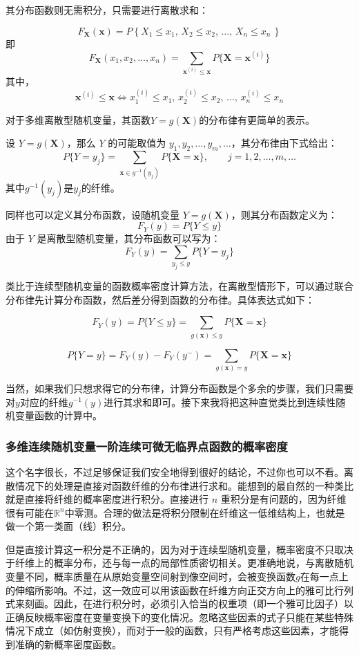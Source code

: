 其分布函数则无需积分，只需要进行离散求和：

\[
F_{\mathbf{X}}(\mathbf{x}) = P\left\{X_1 \leq x_1,\, X_2 \leq x_2,\, \ldots,\, X_n \leq x_n\, \right\}
\]
即
\[
F_{\mathbf{X}}(x_1, x_2, \ldots, x_n)
= \sum_{\mathbf{x}^{(i)} \leq \mathbf{x}} P\{\mathbf{X} = \mathbf{x}^{(i)}\}
\]
其中，
\[
\mathbf{x}^{(i)} \leq \mathbf{x} \iff x_1^{(i)} \leq x_1,\, x_2^{(i)} \leq x_2,\, \ldots,\, x_n^{(i)} \leq x_n
\]

对于多维离散型随机变量，其函数$Y = g(\mathbf{X})$的分布律有更简单的表示。

设 $Y = g(\mathbf{X})$，那么 $Y$ 的可能取值为 $y_1,y_2,\ldots,y_m,\ldots$，其分布律由下式给出：
\[
P\{Y = y_j\} = \sum_{\mathbf{x} \in g^{-1}(y_j)} P\{\mathbf{X} = \mathbf{x}\},\qquad j=1,2,\ldots, m, \ldots
\]
其中$g^{-1}(y_j)$是$y_j$的纤维。

同样也可以定义其分布函数，设随机变量 $Y = g(\mathbf{X})$，则其分布函数定义为：
\[
F_Y(y) = P\{Y \leq y\}
\]
由于 $Y$ 是离散型随机变量，其分布函数可以写为：
\[
F_Y(y) = \sum_{y_j \leq y} P\{Y = y_j\}
\]

类比于连续型随机变量的函数概率密度计算方法，在离散型情形下，可以通过联合分布律先计算分布函数，然后差分得到函数的分布律。具体表达式如下：

\[
F_Y(y) = P\{ Y \leq y \} = \sum_{g(\mathbf{x}) \leq y} P\{ \mathbf{X} = \mathbf{x} \}
\]

\[
P\{ Y = y \} = F_Y(y) - F_Y(y^-) = \sum_{g(\mathbf{x}) = y} P\{ \mathbf{X} = \mathbf{x} \}
\]

当然，如果我们只想求得它的分布律，计算分布函数是个多余的步骤，我们只需要对$y$对应的纤维$g^{-1}(y)$进行其求和即可。接下来我将把这种直觉类比到连续性随机变量函数的计算中。

\subsubsection{多维连续随机变量一阶连续可微无临界点函数的概率密度}

这个名字很长，不过足够保证我们安全地得到很好的结论，不过你也可以不看。离散情况下的处理是直接对函数纤维的分布律进行求和。能想到的最自然的一种类比就是直接将纤维的概率密度进行积分。直接进行 $n$ 重积分是有问题的，因为纤维很有可能在$\mathbb{R}^n$中零测。合理的做法是将积分限制在纤维这一低维结构上，也就是做一个第一类面（线）积分。

但是直接计算这一积分是不正确的，因为对于连续型随机变量，概率密度不只取决于纤维上的概率分布，还与每一点的局部性质密切相关。更准确地说，与离散随机变量不同，概率质量在从原始变量空间射到像空间时，会被变换函数$g$在每一点上的伸缩所影响。不过，这一效应可以用该函数在纤维方向正交方向上的雅可比行列式来刻画。因此，在进行积分时，必须引入恰当的权重项（即一个雅可比因子）以正确反映概率密度在变量变换下的变化情况。忽略这些因素的式子只能在某些特殊情况下成立（如仿射变换），而对于一般的函数，只有严格考虑这些因素，才能得到准确的新概率密度函数。

